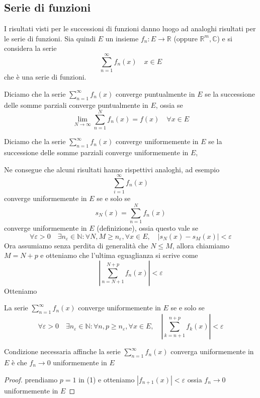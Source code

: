 \subsection{Serie di funzioni}
I risultati visti per le successioni di funzioni danno luogo ad analoghi
risultati per le serie di funzioni.
Sia quindi \(E\) un insieme \(f_{n} : E \to \mathbb{R}\) (oppure
\(\mathbb{R}^{m}, \mathbb{C}\)) e si considera la serie 
\[
    \sum_{n=1}^{\infty} f_{n}(x)\quad x \in E
\]
che è una serie di funzioni.
\begin{definition}
    Diciamo che la serie \(\sum_{n=1}^{\infty} f_{n}(x)\) converge puntualmente
    in \(E\) se la successione delle somme parziali converge puntualmente in
    \(E\), ossia se 
    \[
        \lim_{N \to \infty} \sum_{n=1}^{N} f_{n}(x) = f(x) \quad \forall x \in E
    \]

    Diciamo che la serie \(\sum_{n=1}^{\infty} f_{n}(x)\) converge uniformemente
    in \(E\) se la successione delle somme parziali converge uniformemente in
    \(E\),
\end{definition}
Ne consegue che alcuni risultati hanno rispettivi analoghi, ad esempio
    \[
        \sum_{i=1}^{\infty} f_{n}(x) 
    \]
    converge uniformemente in \(E\) se e solo se 
    \[
        s_N(x) = \sum_{n=1}^{N} f_{n}(x)
    \]
    converge uniformemente in \(E\) (definizione), ossia questo vale se 
    \[
        \forall \varepsilon > 0 \quad \exists n_\varepsilon \in \mathbb{N} :
        \forall N, M \ge n_\varepsilon, \forall x \in E, \quad |s_N(x) - s_M(x)|
        < \varepsilon
    \]
    Ora assumiamo senza perdita di generalità che \(N \le  M\), allora chiamiamo
    \(M = N + p\) e otteniamo che l'ultima eguaglianza si scrive come
    \[
        \left| \sum_{n=N+1}^{N+p} f_{n}(x) \right| < \varepsilon
    \]
Otteniamo
\begin{proposition}
    La serie \(\sum_{n=1}^{\infty} f_{n}(x)\) converge uniformemente in \(E\) se
    e solo se 
    \begin{equation}
        \forall \varepsilon > 0 \quad \exists n_\varepsilon \in \mathbb{N} :
        \forall n, p \ge n_\varepsilon, \forall x \in E, \quad \left|
        \sum_{k=n+1}^{n+p}
        f_{k}(x) \right| < \varepsilon
    \end{equation}
\end{proposition}
\begin{corollary}
    Condizione necessaria affinche la serie \(\sum_{n=1}^{\infty} f_{n}(x)\)
    converga uniformemente in \(E\) è che \(f_{n} \to 0\) uniformemente in \(E\)
\end{corollary}
\begin{proof}
    prendiamo \(p=1\) in (1) e otteniamo
    \(
        \left| f_{n+1}(x) \right| < \varepsilon
    \)
    ossia \(f_{n} \to 0\) uniformemente in \(E\) 
\end{proof}

